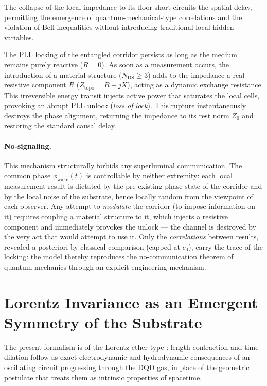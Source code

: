 \documentclass[11pt,a4paper]{article}
\theoremstyle{plain}
\theoremstyle{remark}
\newcommand{\Ncd}{\ensuremath{N_{\mathrm{DS}}}}
\begin{document}
The collapse of the local impedance to its floor short-circuits the spatial delay, permitting the emergence of quantum-mechanical-type correlations and the violation of Bell inequalities without introducing traditional local hidden variables.

The PLL locking of the entangled corridor persists as long as the medium remains purely reactive ($R = 0$). As soon as a measurement occurs, the introduction of a material structure ($\Ncd \ge 3$) adds to the impedance a real resistive component $R$ ($Z_{\text{topo}} = R + jX$), acting as a dynamic exchange resistance. This irreversible energy transit injects active power that saturates the local cells, provoking an abrupt PLL unlock (\emph{loss of lock}). This rupture instantaneously destroys the phase alignment, returning the impedance to its rest norm $Z_0$ and restoring the standard causal delay.

\paragraph{No-signaling.} This mechanism structurally forbids any superluminal communication. The common phase $\phi_{\text{wake}}(t)$ is controllable by neither extremity: each local measurement result is dictated by the pre-existing phase state of the corridor and by the local noise of the substrate, hence locally random from the viewpoint of each observer. Any attempt to \emph{modulate} the corridor (to impose information on it) requires coupling a material structure to it, which injects a resistive component and immediately provokes the unlock --- the channel is destroyed by the very act that would attempt to use it. Only the \emph{correlations} between results, revealed a posteriori by classical comparison (capped at $c_0$), carry the trace of the locking: the model thereby reproduces the no-communication theorem of quantum mechanics through an explicit engineering mechanism.

\section{Lorentz Invariance as an Emergent Symmetry of the Substrate}
\label{sec:lorentz}

The present formalism is of the Lorentz-ether type \cite{einstein1920}: length contraction and time dilation follow as exact electrodynamic and hydrodynamic consequences of an oscillating circuit progressing through the DQD gas, in place of the geometric postulate that treats them as intrinsic properties of spacetime.
\end{document}
